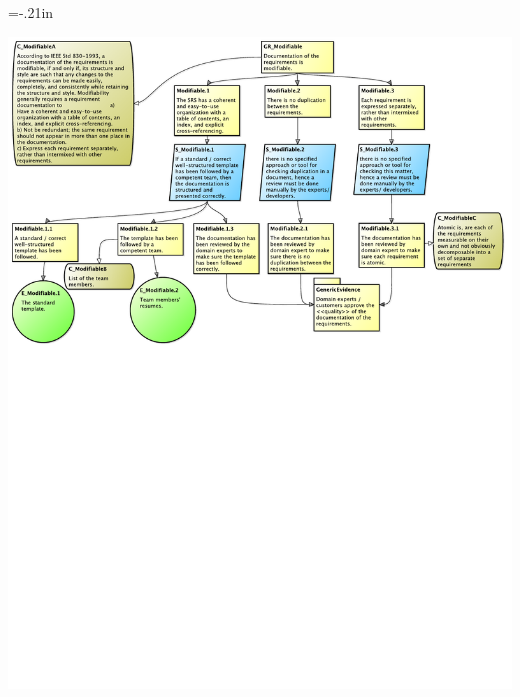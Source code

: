 \documentclass[t,12pt,numbers,fleqn]{beamer}
\begin{document}
\hoffset=-.21in
\begin{frame}[plain]

\includegraphics[width=1.14\textwidth]{../Figures/Modifiable.pdf}

\end{frame}
\hoffset=0in

\end{document}

